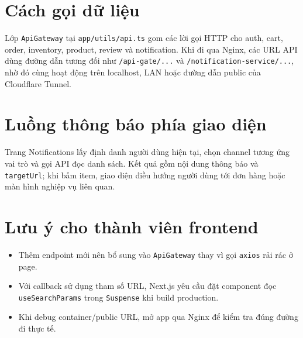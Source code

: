 \documentclass[12pt]{article}
\begin{document}
\section{Cách gọi dữ liệu}
Lớp \texttt{ApiGateway} tại \texttt{app/utils/api.ts} gom các lời gọi HTTP cho auth, cart, order, inventory, product, review và notification. Khi đi qua Nginx, các URL API dùng đường dẫn tương đối như \texttt{/api-gate/...} và \texttt{/notification-service/...}, nhờ đó cùng hoạt động trên localhost, LAN hoặc đường dẫn public của Cloudflare Tunnel.

\section{Luồng thông báo phía giao diện}
Trang Notifications lấy định danh người dùng hiện tại, chọn channel tương ứng vai trò và gọi API đọc danh sách. Kết quả gồm nội dung thông báo và \texttt{targetUrl}; khi bấm item, giao diện điều hướng người dùng tới đơn hàng hoặc màn hình nghiệp vụ liên quan.

\section{Lưu ý cho thành viên frontend}
\begin{itemize}
  \item Thêm endpoint mới nên bổ sung vào \texttt{ApiGateway} thay vì gọi \texttt{axios} rải rác ở page.
  \item Với callback sử dụng tham số URL, Next.js yêu cầu đặt component đọc \texttt{useSearchParams} trong \texttt{Suspense} khi build production.
  \item Khi debug container/public URL, mở app qua Nginx để kiểm tra đúng đường đi thực tế.
\end{itemize}
\end{document}
